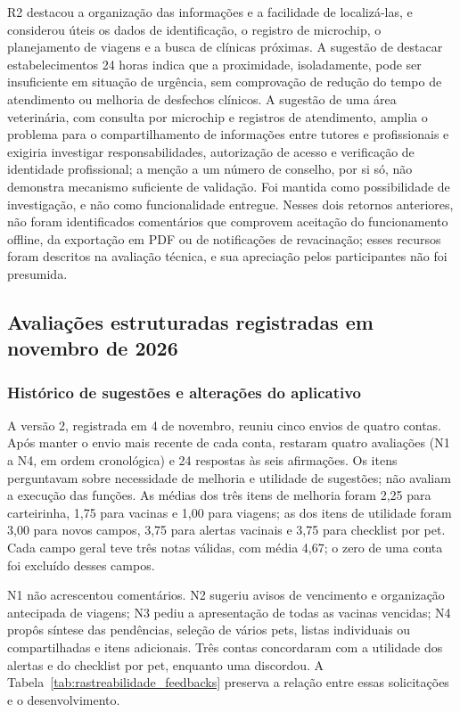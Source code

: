 \documentclass{UNESC}
\begin{document}
R2 destacou a organização das informações e a facilidade de localizá-las, e considerou úteis os dados de identificação, o registro de microchip, o planejamento de viagens e a busca de clínicas próximas. A sugestão de destacar estabelecimentos 24 horas indica que a proximidade, isoladamente, pode ser insuficiente em situação de urgência, sem comprovação de redução do tempo de atendimento ou melhoria de desfechos clínicos. A sugestão de uma área veterinária, com consulta por microchip e registros de atendimento, amplia o problema para o compartilhamento de informações entre tutores e profissionais e exigiria investigar responsabilidades, autorização de acesso e verificação de identidade profissional; a menção a um número de conselho, por si só, não demonstra mecanismo suficiente de validação. Foi mantida como possibilidade de investigação, e não como funcionalidade entregue. Nesses dois retornos anteriores, não foram identificados comentários que comprovem aceitação do funcionamento offline, da exportação em PDF ou de notificações de revacinação; esses recursos foram descritos na avaliação técnica, e sua apreciação pelos participantes não foi presumida.

\subsection{Avaliações estruturadas registradas em novembro de 2026}
\label{sec:feedbacks_novembro}

\subsubsection{Histórico de sugestões e alterações do aplicativo}

A versão 2, registrada em 4 de novembro, reuniu cinco envios de quatro contas. Após manter o envio mais recente de cada conta, restaram quatro avaliações (N1 a N4, em ordem cronológica) e 24 respostas às seis afirmações. Os itens perguntavam sobre necessidade de melhoria e utilidade de sugestões; não avaliam a execução das funções. As médias dos três itens de melhoria foram 2,25 para carteirinha, 1,75 para vacinas e 1,00 para viagens; as dos itens de utilidade foram 3,00 para novos campos, 3,75 para alertas vacinais e 3,75 para checklist por pet. Cada campo geral teve três notas válidas, com média 4,67; o zero de uma conta foi excluído desses campos.

N1 não acrescentou comentários. N2 sugeriu avisos de vencimento e organização antecipada de viagens; N3 pediu a apresentação de todas as vacinas vencidas; N4 propôs síntese das pendências, seleção de vários pets, listas individuais ou compartilhadas e itens adicionais. Três contas concordaram com a utilidade dos alertas e do checklist por pet, enquanto uma discordou. A Tabela~\ref{tab:rastreabilidade_feedbacks} preserva a relação entre essas solicitações e o desenvolvimento.
\end{document}

